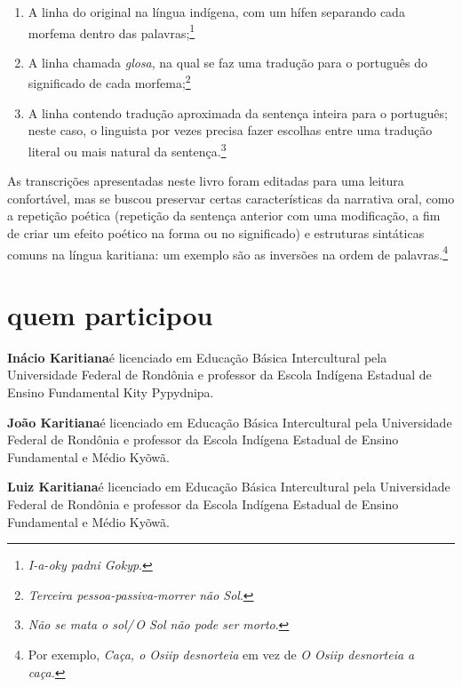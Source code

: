 \begin{enumerate}
\item A linha do original na língua indígena, com um hífen
separando cada morfema dentro das palavras;\footnote{\textit{I-a-oky padni Gokyp}.}

\item A linha chamada
\textit{glosa}, na qual se faz uma tradução para o português do
significado de cada morfema;\footnote{\textit{Terceira pessoa-passiva-morrer não Sol}.}

\item A linha contendo tradução
aproximada da sentença inteira para o português; neste caso, o linguista
por vezes precisa fazer escolhas entre uma tradução literal ou mais natural da sentença.\footnote{\textit{Não se mata o sol/\,O Sol não pode ser morto}.}

\end{enumerate}

As transcrições apresentadas neste livro foram editadas para uma leitura
confortável, mas se buscou preservar certas características da narrativa
oral, como a repetição poética (repetição da sentença anterior com uma
modificação, a fim de criar um efeito poético na forma ou no
significado) e estruturas sintáticas comuns na língua karitiana: um
exemplo são as inversões na ordem de palavras.\footnote{Por exemplo, \textit{Caça, o
Osiip desnorteia} em vez de \textit{O Osiip desnorteia a caça.}}

\pagebreak

\section{quem participou\protect\footnotemark}

\medskip

\noindent \textbf{Inácio Karitiana}\quad é licenciado em Educação Básica Intercultural pela
 Universidade Federal de Rondônia e professor da Escola Indígena Estadual
 de Ensino Fundamental Kity Pypydnipa.
\medskip

\noindent \textbf{João Karitiana}\quad é licenciado em Educação Básica Intercultural pela
 Universidade Federal de Rondônia e professor da Escola Indígena Estadual
 de Ensino Fundamental e Médio Kyõwã.
\medskip

\noindent \textbf{Luiz Karitiana}\quad é licenciado em Educação Básica Intercultural pela
 Universidade Federal de Rondônia e professor da Escola Indígena Estadual
 de Ensino Fundamental e Médio Kyõwã.
\medskip

